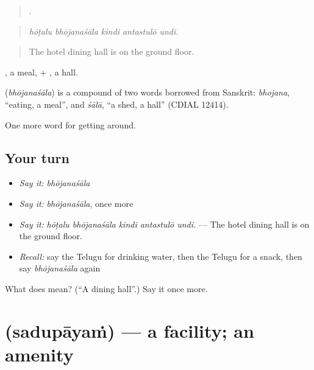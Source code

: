 \begin{quote}
    .
\end{quote}

\begin{quote}
\emph{hōṭalu bhōjanaśāla kindi antastulō undi.}
\end{quote}

\begin{quote}
The hotel dining hall is on the ground floor.
\end{quote}

, a meal, + , a hall.

\begin{cousinweb}
\textbf{} (\emph{bhōjanaśāla}) is a compound of two words borrowed from Sanskrit: \emph{bhojana}, \textquotedblleft{}eating, a meal\textquotedblright{}, and \emph{śālā}, \textquotedblleft{}a shed, a hall\textquotedblright{} (CDIAL 12414).
\end{cousinweb}

\begin{grammarlens}[title={What you've built}]
One more word for getting around.
\end{grammarlens}

\subsection*{Your turn}
\begin{itemize}
\raggedright
  \item \emph{Say it:} \emph{bhōjanaśāla}
  \item \emph{Say it:} \emph{bhōjanaśāla}, once more
  \item \emph{Say it:} \emph{hōṭalu bhōjanaśāla kindi antastulō undi.} — The hotel dining hall is on the ground floor.
  \item \emph{Recall:} say the Telugu for drinking water, then the Telugu for a snack, then say \emph{bhōjanaśāla} again
\end{itemize}

\begin{tcolorbox}[breakable,colback=teal!4,colframe=teal!35!black,title={Before you move on}]
What does  mean? (\textquotedblleft{}A dining hall\textquotedblright{}.) Say it once more.
\end{tcolorbox}
\section[\texorpdfstring{\te{సదుపాయం} (sadupāyaṁ)}{సదుపాయం (sadupāyaṁ)}]{ (sadupāyaṁ) — a facility; an amenity}

